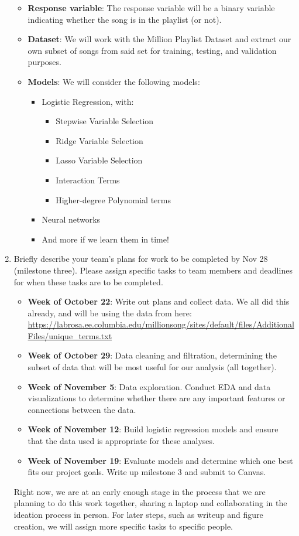 \documentclass[12pt]{article}
\begin{document}
\begin{enumerate}
\begin{itemize}
        \item \textbf{Response variable}: The response variable will be a binary variable indicating whether the song is in the playlist (or not).
        \item \textbf{Dataset}: We will work with the Million Playlist Dataset and extract our own subset of songs from said set for training, testing, and validation purposes. 
        \item \textbf{Models}: We will consider the following models:
        \begin{itemize}
            \item Logistic Regression, with:
            \begin{itemize}
                \item Stepwise Variable Selection
                \item Ridge Variable Selection
                \item Lasso Variable Selection 
                \item Interaction Terms
                \item Higher-degree Polynomial terms
            \end{itemize}
        \item Neural networks
        \item And more if we learn them in time!
        \end{itemize}
    \end{itemize}
    \item Briefly describe your team’s plans for work to be completed by Nov 28 (milestone three). Please assign specific tasks to team members and deadlines for when these tasks are to be completed. 
    \begin{itemize}
        \item \textbf{Week of October 22}: Write out plans and collect data. We all did this already, and will be using the data from here: \url{https://labrosa.ee.columbia.edu/millionsong/sites/default/files/AdditionalFiles/unique_terms.txt}
        \item \textbf{Week of October 29}: Data cleaning and filtration, determining the subset of data that will be most useful for our analysis (all together). 
        \item \textbf{Week of November 5}: Data exploration. Conduct EDA and data visualizations to determine whether there are any important features or connections between the data.
        \item \textbf{Week of November 12}: Build logistic regression models and ensure that the data used is appropriate for these analyses.
        \item \textbf{Week of November 19}: Evaluate models and determine which one best fits our project goals. Write up milestone 3 and submit to Canvas.
    \end{itemize}
    Right now, we are at an early enough stage in the process that we are planning to do this work together, sharing a laptop and collaborating in the ideation process in person. For later steps, such as writeup and figure creation, we will assign more specific tasks to specific people.
\end{enumerate}

\bigskip
\end{document}
